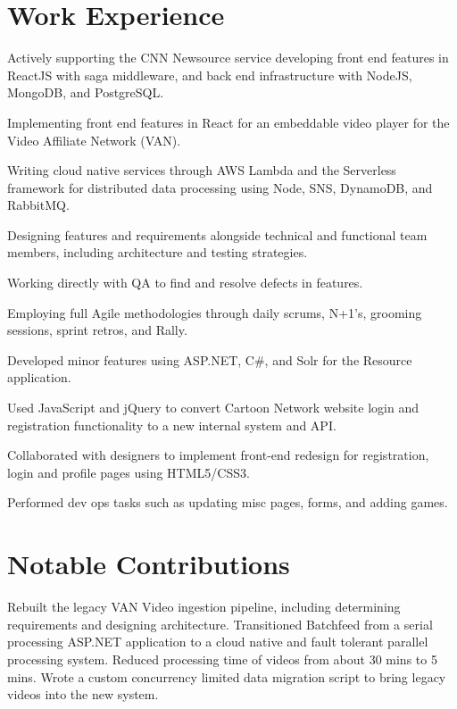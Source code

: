 \documentclass[]{deedy-resume-openfont}
\begin{document}
\begin{minipage}[t]{0.66\textwidth}
\section{Work Experience}
\vspace{\topsep} %
\begin{tightemize}
\item Actively supporting the CNN Newsource service developing front end features in ReactJS with saga middleware, and back end infrastructure with NodeJS, MongoDB, and PostgreSQL. 
\item Implementing front end features in React for an embeddable video player for the Video Affiliate Network (VAN).
\item Writing cloud native services through AWS Lambda and the Serverless framework for distributed data processing using Node, SNS, DynamoDB, and RabbitMQ.
\item Designing features and requirements alongside technical and functional team members, including architecture and testing strategies.
\item Working directly with QA to find and resolve defects in features.
\item Employing full Agile methodologies through daily scrums, N+1's, grooming sessions, sprint retros, and Rally.
\item Developed minor features using ASP.NET, C\#, and Solr for the Resource application.
\end{tightemize}
\sectionsep

\begin{tightemize}
\item Used JavaScript and jQuery to convert Cartoon Network website login and registration functionality to a new internal system and API.
\item Collaborated with designers to implement front-end redesign for registration, login and profile pages using HTML5/CSS3.
\item Performed dev ops tasks such as updating misc pages, forms, and adding games.
\end{tightemize}
\sectionsep

\section{Notable Contributions}
Rebuilt the legacy VAN Video ingestion pipeline, including determining requirements and designing architecture. Transitioned Batchfeed from a serial processing ASP.NET application to a cloud native and fault tolerant parallel processing system. Reduced processing time of videos from about 30 mins to 5 mins. Wrote a custom concurrency limited data migration script to bring legacy videos into the new system.
\sectionsep


\end{minipage}
\end{document}
